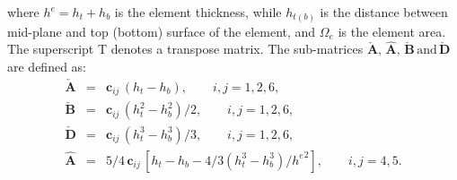 %
%
%
where \(h^e=h_t+h_b\) is the element thickness, while \(h_{t(b)}\) is the distance between mid-plane and top (bottom) surface of the element, and \(\Omega_e\) is the element area.
The superscript T denotes a transpose matrix.
The sub-matrices \(\check{\textbf{A}},\,\hat{\textbf{A}},\,\check{\textbf{B}}\,\mathrm{and}\,\check{\textbf{D}}\) are defined as:
\begin{eqnarray}
	\check{\textbf{A}} & = & \textbf{c}_{ij}\,(h_t-h_b),\qquad i,j=1,2,6\nonumber,\\
	\check{\textbf{B}} & = & \textbf{c}_{ij}\,(h_t^2-h_b^2)/2,\qquad i,j=1,2,6\nonumber,\\
	\check{\textbf{D}} & = & \textbf{c}_{ij}\,(h_t^3-h_b^3)/3,\qquad i,j=1,2,6\nonumber,\\
	\hat{\textbf{A}} & = & 5/4\,\textbf{c}_{ij}\,\left[h_t-h_b-4/3\left(h_t^3-h_b^3\right)/{h^e}^2\right],\qquad i,j=4,5.
\end{eqnarray}
%